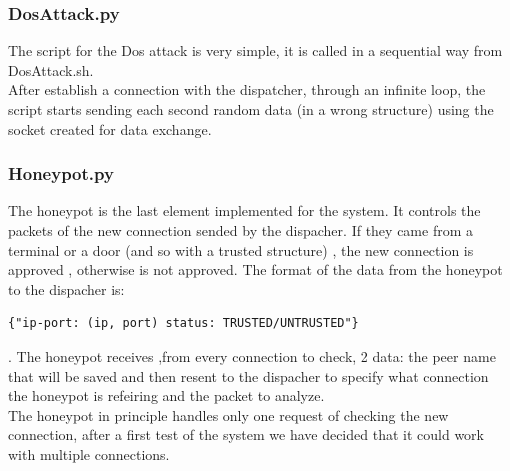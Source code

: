 \subsubsection{DosAttack.py}
The script for the Dos attack is very simple, it is called in a sequential way from DosAttack.sh.\\
 After establish a connection with the dispatcher, through an infinite loop,  the script starts sending each second random data (in a wrong structure) using the socket created for data exchange. 


\subsubsection{Honeypot.py}
The honeypot is the last element implemented for the system. It controls the packets of the new connection sended by the dispacher. If they came from a terminal or a door (and so with a trusted structure) , the new connection is approved , otherwise is not approved. The format of the data from the honeypot to the dispacher is: \begin{verbatim}{"ip-port: (ip, port) status: TRUSTED/UNTRUSTED"}\end{verbatim} . The honeypot receives ,from every connection to check, 2 data: the peer name that will be saved and then resent to the dispacher to specify what connection the honeypot is refeiring and the packet to analyze.\\ 
The honeypot in principle handles only one request of checking the new connection, after a first test of the system we have decided that it could work with multiple connections.


